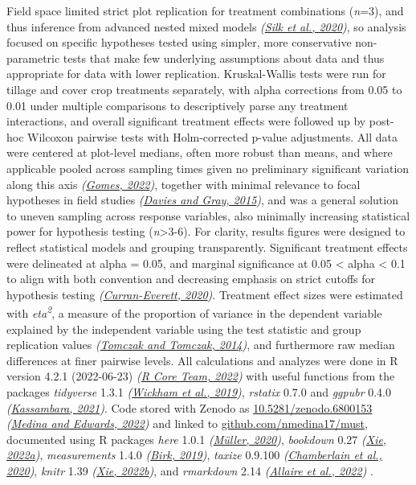 \documentclass[
  12pt,
]{article}
\begin{document}
Field space limited strict plot replication for treatment combinations (\emph{n}=3), and thus inference from advanced nested mixed models \emph{(\protect\hyperlink{ref-silk20}{Silk et al., 2020})}, so analysis focused on specific hypotheses tested using simpler, more conservative non-parametric tests that make few underlying assumptions about data and thus appropriate for data with lower replication.
Kruskal-Wallis tests were run for tillage and cover crop treatments separately, with alpha corrections from 0.05 to 0.01 under multiple comparisons to descriptively parse any treatment interactions, and overall significant treatment effects were followed up by post-hoc Wilcoxon pairwise tests with Holm-corrected p-value adjustments.
All data were centered at plot-level medians, often more robust than means, and where applicable pooled across sampling times given no preliminary significant variation along this axis \emph{(\protect\hyperlink{ref-gomes22}{Gomes, 2022})}, together with minimal relevance to focal hypotheses in field studies
\emph{(\protect\hyperlink{ref-davies15a}{Davies and Gray, 2015})},
and was a general solution to uneven sampling across response variables, also minimally increasing statistical power for hypothesis testing (\emph{n}\textgreater3-6).
For clarity, results figures were designed to reflect statistical models and grouping transparently.
Significant treatment effects were delineated at alpha = 0.05, and marginal significance at 0.05 \textless{} alpha \textless{} 0.1 to align with both convention and decreasing emphasis on strict cutoffs for hypothesis testing \emph{(\protect\hyperlink{ref-curran-everett20}{Curran-Everett, 2020})}.
Treatment effect sizes were estimated with \emph{eta\textsuperscript{2}},
a measure of the proportion of variance in the dependent variable explained by the independent variable using the test statistic and group replication values \emph{(\protect\hyperlink{ref-tomczak14}{Tomczak and Tomczak, 2014})},
and furthermore raw median differences at finer pairwise levels.
All calculations and analyzes were done in R version 4.2.1 (2022-06-23) \emph{(\protect\hyperlink{ref-base}{R Core Team, 2022})} with useful functions from the packages \emph{tidyverse} 1.3.1 \emph{(\protect\hyperlink{ref-tidyverse}{Wickham et al., 2019})}, \emph{rstatix} 0.7.0 and \emph{ggpubr} 0.4.0 \emph{(\protect\hyperlink{ref-rstatix}{Kassambara, 2021})}.
Code stored with Zenodo as \href{https://doi.org/10.5281/zenodo.6800153}{10.5281/zenodo.6800153} \emph{(\protect\hyperlink{ref-softwareMedinaEdwards22}{Medina and Edwards, 2022})} and linked to \url{github.com/nmedina17/must},
documented using R packages
\emph{here} 1.0.1 \emph{(\protect\hyperlink{ref-here}{Müller, 2020})},
\emph{bookdown} 0.27 \emph{(\protect\hyperlink{ref-bookdown2022}{Xie, 2022a})},
\emph{measurements} 1.4.0 \emph{(\protect\hyperlink{ref-measurements}{Birk, 2019})},
\emph{taxize} 0.9.100 \emph{(\protect\hyperlink{ref-taxize2020}{Chamberlain et al., 2020})},
\emph{knitr} 1.39 \emph{(\protect\hyperlink{ref-knitr2022}{Xie, 2022b})}, and
\emph{rmarkdown} 2.14 \emph{(\protect\hyperlink{ref-rmarkdown2022}{Allaire et al., 2022})}
.
\end{document}
